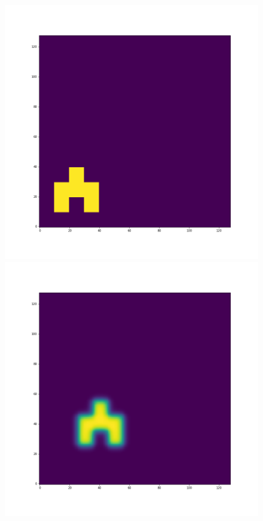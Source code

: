 \documentclass[12pt,a4paper]{article}
\begin{document}
\begin{figure}[H]
\centering
\begin{minipage}{.3\textwidth}
  \centering
  \includegraphics[width=\linewidth]{Pictures/Solve2DWhiteBearMovementTestMUSCL/Solve2DWhiteBearMovementTest_t0.png}
\end{minipage}%
\begin{minipage}{.3\textwidth}
  \centering
  \includegraphics[width=\linewidth]{Pictures/Solve2DWhiteBearMovementTestMUSCL/Solve2DWhiteBearMovementTest_t10.png}

\end{minipage}
\end{figure}
\end{document}
